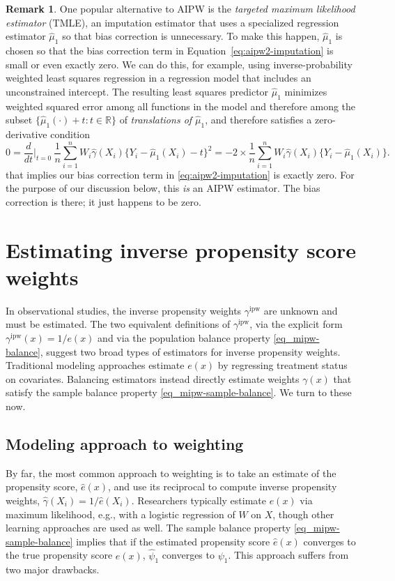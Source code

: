 \documentclass{article}
\theoremstyle{definition}
\newtheorem{remark}{Remark}
\newcommand{\R}{\ensuremath{\mathbb{R}}}
\newcommand{\ipw}{\text{ipw}}
\newcommand{\hgammaipw}{\ensuremath{\hat\gamma}}
\newcommand{\gammaipw}{\ensuremath{\gamma^{\ipw}}}
\newcommand{\<}{\langle}
\renewcommand{\>}{\rangle}
\begin{document}
\begin{remark}
\label{remark:tmle}
One popular alternative to AIPW is the \emph{targeted maximum likelihood estimator} (TMLE), an imputation estimator  that uses a specialized regression estimator $\hat \mu_1$ so that bias correction is unnecessary. To make this happen, $\hat \mu_1$ is chosen so that the bias correction term in Equation~\ref{eq:aipw2-imputation} is small or even exactly zero. We can do this, for example, using inverse-probability weighted least squares regression in a regression model that includes an unconstrained intercept. The resulting least squares predictor $\hat \mu_1$ minimizes weighted squared error among all functions in the model and therefore among the subset $\{ \hat \mu_1(\cdot) + t : t \in \R \}$ of \emph{translations of $\hat \mu_1$}, and therefore satisfies a zero-derivative condition
$$
0 = \frac{d}{dt}\Big|_{t=0} \ \frac{1}{n}\sum_{i=1}^n W_i \hat\gamma(X_i) \{ Y_i - \hat \mu_1(X_i) - t \}^2 = -2 \times \frac{1}{n}\sum_{i=1}^n W_i \hat\gamma(X_i) \{ Y_i - \hat \mu_1(X_i) \}.
$$
that implies our bias correction term in \eqref{eq:aipw2-imputation} is exactly zero. For the purpose of our discussion below, this \emph{is} an AIPW estimator. The bias correction is there; it just happens to be zero.
\end{remark}




\section{Estimating inverse propensity score weights}
\label{sec:ipw}

In observational studies, the inverse propensity weights $\gammaipw$ are unknown and must be estimated. The two equivalent definitions of
$\gammaipw$, via the explicit form $\gammaipw(x)=1/e(x)$ and via the population balance property \eqref{eq_mipw-balance},
suggest two broad types of estimators for inverse propensity weights.
Traditional modeling approaches estimate $e(x)$ by regressing treatment status on covariates.
Balancing estimators instead directly estimate weights $\gamma(x)$ that satisfy the sample balance property \eqref{eq_mipw-sample-balance}.
We turn to these now.

\vspace{-.3cm}
\subsection{Modeling approach to weighting}
\label{sec:mipw}
By far, the most common approach to weighting is to take an estimate of the propensity score, $\hat{e}(x)$, and use its reciprocal to compute inverse propensity weights, $\hgammaipw(X_i)=1/\hat{e}(X_i)$.
Researchers typically estimate $e(x)$ via maximum likelihood, e.g., with a logistic regression of $W$ on $X$, though other learning approaches are used as well.
The sample balance property \eqref{eq_mipw-sample-balance} implies that if the estimated propensity score $\hat{e}(x)$ converges to the true propensity score $e(x)$,
$\hat{\psi}_1$ converges to $\psi_1$. This approach suffers from two major drawbacks.
\end{document}
